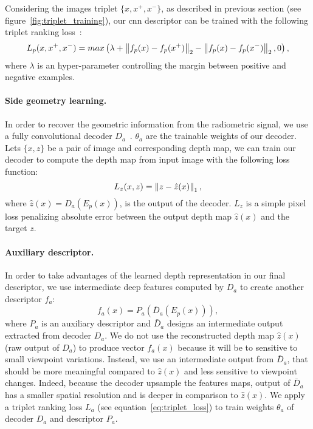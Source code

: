Considering the images triplet $\{x, x^+, x^-\}$, as described in previous section (see figure~\ref{fig:triplet_training}), our \ac{cnn} descriptor can be trained with the following triplet ranking loss~\citep{Arandjelovic2017}:
\begin{equation}
	\label{eq:triplet_loss}
	L_p(x, x^+, x^-) = max\left(\lambda + \left\lVert f_p(x) - f_p(x^+)\right\rVert_2 - \left\lVert f_p(x) - f_p(x^-)\right\rVert_2, 0 \right),
\end{equation}
where $\lambda$ is an hyper-parameter controlling the margin between positive and negative examples.

\paragraph{Side geometry learning.}
In order to recover the geometric information from the radiometric signal, we use a fully convolutional decoder $D_a$~\citep{Eigen2014}. $\theta_{a}$ are the trainable weights of our decoder. Lets $\{x, z\}$ be a pair of image and corresponding depth map, we can train our decoder to compute the depth map from input image with the following loss function:
\begin{equation}
	\label{eq:l1_loss}
    L_z(x,z) = \left\lVert z - \hat{z}(x)\right\rVert_{1},
\end{equation}
where $\hat{z}(x) = D_a(E_p(x))$, is the output of the decoder. $L_z$ is a simple pixel loss penalizing absolute error between the output depth map $\hat{z}(x)$ and the target $z$.

\paragraph{Auxiliary descriptor.}
In order to take advantages of the learned depth representation in our final descriptor, we use intermediate deep features computed by $D_a$ to create another descriptor $f_a$:
\begin{equation}
	\label{eq:desc_aux}
	f_a(x) = P_a(\bar{D}_a(E_p(x))),
\end{equation}
where $P_a$ is an auxiliary descriptor and $\bar{D}_a$ designs an intermediate output extracted from decoder $D_a$. We do not use the reconstructed depth map $\hat{z}(x)$ (\ie raw output of $D_a$) to produce vector $f_a(x)$ because it will be to sensitive to small viewpoint variations. Instead, we use an intermediate output from $\bar{D}_a$, that should be more meaningful compared to  $\hat{z}(x)$ and less sensitive to viewpoint changes. Indeed, because the decoder upsample the features maps, output of $\bar{D}_a$ has a smaller spatial resolution and is deeper in comparison to $\hat{z}(x)$. We apply a triplet ranking loss $L_a$ (see equation~\ref{eq:triplet_loss}) to train weights $\theta_{a}$ of decoder $D_a$ and descriptor $P_a$. 

